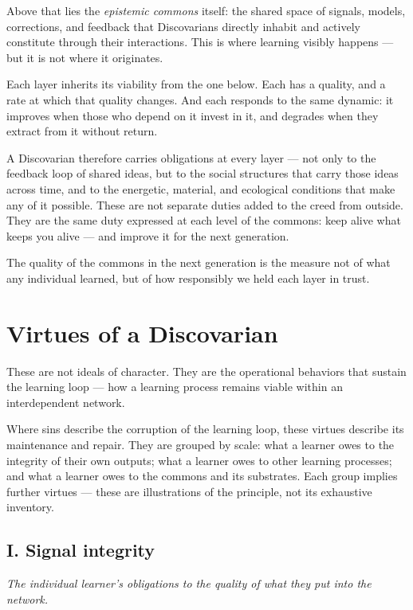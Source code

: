 \documentclass[12pt, a4paper]{article}
\begin{document}
Above that lies the \textit{epistemic commons} itself: the shared space of
signals, models, corrections, and feedback that Discovarians directly inhabit
and actively constitute through their interactions. This is where learning
visibly happens — but it is not where it originates.

Each layer inherits its viability from the one below. Each has a quality, and
a rate at which that quality changes. And each responds to the same dynamic:
it improves when those who depend on it invest in it, and degrades when they
extract from it without return.

A Discovarian therefore carries obligations at every layer — not only to the
feedback loop of shared ideas, but to the social structures that carry those
ideas across time, and to the energetic, material, and ecological conditions
that make any of it possible. These are not separate duties added to the creed
from outside. They are the same duty expressed at each level of the commons:
keep alive what keeps you alive — and improve it for the next generation.

The quality of the commons in the next generation is the measure not of what
any individual learned, but of how responsibly we held each layer in trust.


\section*{Virtues of a Discovarian}

These are not ideals of character. They are the operational behaviors that
sustain the learning loop — how a learning process remains viable within an
interdependent network.

Where sins describe the corruption of the learning loop, these virtues describe
its maintenance and repair. They are grouped by scale: what a learner owes to
the integrity of their own outputs; what a learner owes to other learning
processes; and what a learner owes to the commons and its substrates. Each
group implies further virtues — these are illustrations of the principle, not
its exhaustive inventory.

\subsection*{I. Signal integrity}
\textit{The individual learner's obligations to the quality of what they
put into the network.}
\end{document}
